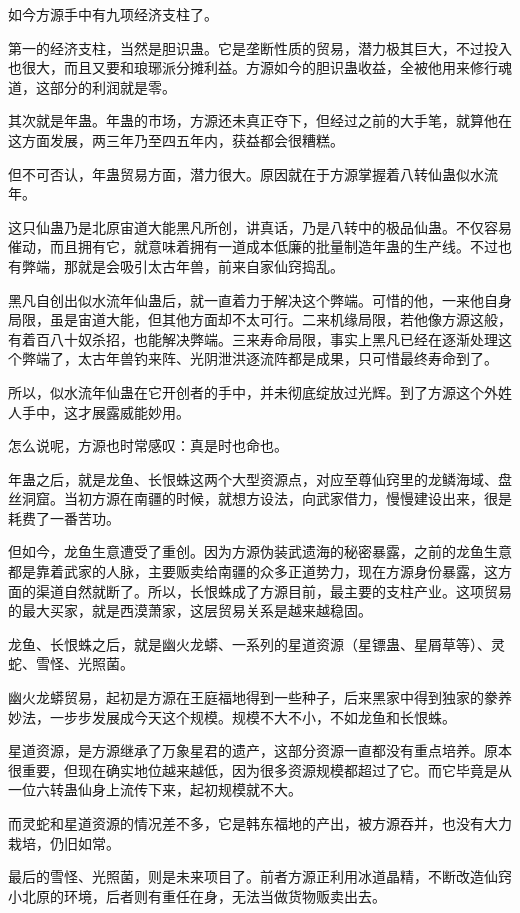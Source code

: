 \begin{this_body}
如今方源手中有九项经济支柱了。

第一的经济支柱，当然是胆识蛊。它是垄断性质的贸易，潜力极其巨大，不过投入也很大，而且又要和琅琊派分摊利益。方源如今的胆识蛊收益，全被他用来修行魂道，这部分的利润就是零。

其次就是年蛊。年蛊的市场，方源还未真正夺下，但经过之前的大手笔，就算他在这方面发展，两三年乃至四五年内，获益都会很糟糕。

但不可否认，年蛊贸易方面，潜力很大。原因就在于方源掌握着八转仙蛊似水流年。

这只仙蛊乃是北原宙道大能黑凡所创，讲真话，乃是八转中的极品仙蛊。不仅容易催动，而且拥有它，就意味着拥有一道成本低廉的批量制造年蛊的生产线。不过也有弊端，那就是会吸引太古年兽，前来自家仙窍捣乱。

黑凡自创出似水流年仙蛊后，就一直着力于解决这个弊端。可惜的他，一来他自身局限，虽是宙道大能，但其他方面却不太可行。二来机缘局限，若他像方源这般，有着百八十奴杀招，也能解决弊端。三来寿命局限，事实上黑凡已经在逐渐处理这个弊端了，太古年兽钓来阵、光阴泄洪逐流阵都是成果，只可惜最终寿命到了。

所以，似水流年仙蛊在它开创者的手中，并未彻底绽放过光辉。到了方源这个外姓人手中，这才展露威能妙用。

怎么说呢，方源也时常感叹：真是时也命也。

年蛊之后，就是龙鱼、长恨蛛这两个大型资源点，对应至尊仙窍里的龙鳞海域、盘丝洞窟。当初方源在南疆的时候，就想方设法，向武家借力，慢慢建设出来，很是耗费了一番苦功。

但如今，龙鱼生意遭受了重创。因为方源伪装武遗海的秘密暴露，之前的龙鱼生意都是靠着武家的人脉，主要贩卖给南疆的众多正道势力，现在方源身份暴露，这方面的渠道自然就断了。所以，长恨蛛成了方源目前，最主要的支柱产业。这项贸易的最大买家，就是西漠萧家，这层贸易关系是越来越稳固。

龙鱼、长恨蛛之后，就是幽火龙蟒、一系列的星道资源（星镖蛊、星屑草等）、灵蛇、雪怪、光照菌。

幽火龙蟒贸易，起初是方源在王庭福地得到一些种子，后来黑家中得到独家的豢养妙法，一步步发展成今天这个规模。规模不大不小，不如龙鱼和长恨蛛。

星道资源，是方源继承了万象星君的遗产，这部分资源一直都没有重点培养。原本很重要，但现在确实地位越来越低，因为很多资源规模都超过了它。而它毕竟是从一位六转蛊仙身上流传下来，起初规模就不大。

而灵蛇和星道资源的情况差不多，它是韩东福地的产出，被方源吞并，也没有大力栽培，仍旧如常。

最后的雪怪、光照菌，则是未来项目了。前者方源正利用冰道晶精，不断改造仙窍小北原的环境，后者则有重任在身，无法当做货物贩卖出去。


\end{this_body}
